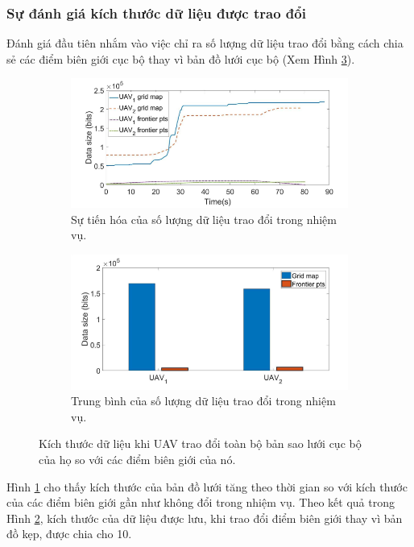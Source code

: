 \documentclass[11pt,openany]{book}
\begin{document}
\subsubsection{Sự đánh giá kích thước dữ liệu được trao đổi}
Đánh giá đầu tiên nhắm vào việc chỉ ra số lượng dữ liệu trao đổi bằng cách chia sẻ các điểm biên giới cục bộ thay vì bản đồ lưới cục bộ (Xem Hình \ref{fig:4.9}).
\begin{figure}[H]
    \centering
    \begin{subfigure}[H]{0.8\linewidth}
        \includegraphics[width=\linewidth]{assets/4_9_a.png}
        \caption{{Sự tiến hóa của số lượng dữ liệu trao đổi trong nhiệm vụ.}}
        \label{fig:4.9a}
    \end{subfigure}
    \begin{subfigure}[H]{0.8\linewidth}
        \includegraphics[width=\linewidth]{assets/4_9_b.png}
        \caption{{Trung bình của số lượng dữ liệu trao đổi trong nhiệm vụ.}}
        \label{fig:4.9b}
    \end{subfigure}
    \caption{{Kích thước dữ liệu khi UAV trao đổi toàn bộ bản sao lưới cục bộ của họ so với các điểm biên giới của nó.}}
    \label{fig:4.9}
\end{figure}
Hình \ref{fig:4.9a} cho thấy kích thước của bản đồ lưới tăng theo thời gian so với kích thước của các điểm biên giới gần như không đổi trong nhiệm vụ. Theo kết quả trong Hình \ref{fig:4.9b}, kích thước của dữ liệu được lưu, khi trao đổi điểm biên giới thay vì bản đồ kẹp, được chia cho 10.
\end{document}
